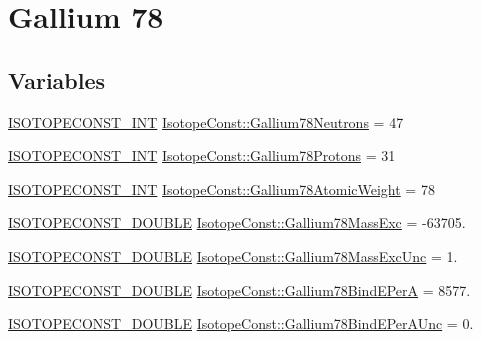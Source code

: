 \hypertarget{group___isotope_const-_gallium-_ga78}{}\section{Gallium 78}
\label{group___isotope_const-_gallium-_ga78}
\subsection*{Variables}
\begin{DoxyCompactItemize}
\item 
\mbox{\hyperlink{group___isotope_const-_macros_ga5f18360b3e99483a35c32d789e62621c}{I\+S\+O\+T\+O\+P\+E\+C\+O\+N\+S\+T\+\_\+\+I\+NT}} \mbox{\hyperlink{group___isotope_const-_gallium-_ga78_gadcd7eb5a26babdfa0c3ebdfb4a52911d}{Isotope\+Const\+::\+Gallium78\+Neutrons}} = 47
\item 
\mbox{\hyperlink{group___isotope_const-_macros_ga5f18360b3e99483a35c32d789e62621c}{I\+S\+O\+T\+O\+P\+E\+C\+O\+N\+S\+T\+\_\+\+I\+NT}} \mbox{\hyperlink{group___isotope_const-_gallium-_ga78_ga6361144357f601dcc11ebe86dadf613e}{Isotope\+Const\+::\+Gallium78\+Protons}} = 31
\item 
\mbox{\hyperlink{group___isotope_const-_macros_ga5f18360b3e99483a35c32d789e62621c}{I\+S\+O\+T\+O\+P\+E\+C\+O\+N\+S\+T\+\_\+\+I\+NT}} \mbox{\hyperlink{group___isotope_const-_gallium-_ga78_ga53f003a51b121d6910489fa93d6bca25}{Isotope\+Const\+::\+Gallium78\+Atomic\+Weight}} = 78
\item 
\mbox{\hyperlink{group___isotope_const-_macros_ga8f45a7272ce02c0b4c65c44636ed719a}{I\+S\+O\+T\+O\+P\+E\+C\+O\+N\+S\+T\+\_\+\+D\+O\+U\+B\+LE}} \mbox{\hyperlink{group___isotope_const-_gallium-_ga78_gae1d5533992513a2825c9c80b7a34bc55}{Isotope\+Const\+::\+Gallium78\+Mass\+Exc}} = -\/63705.
\item 
\mbox{\hyperlink{group___isotope_const-_macros_ga8f45a7272ce02c0b4c65c44636ed719a}{I\+S\+O\+T\+O\+P\+E\+C\+O\+N\+S\+T\+\_\+\+D\+O\+U\+B\+LE}} \mbox{\hyperlink{group___isotope_const-_gallium-_ga78_ga618fa5880c2568991bea8f2a16b03e21}{Isotope\+Const\+::\+Gallium78\+Mass\+Exc\+Unc}} = 1.
\item 
\mbox{\hyperlink{group___isotope_const-_macros_ga8f45a7272ce02c0b4c65c44636ed719a}{I\+S\+O\+T\+O\+P\+E\+C\+O\+N\+S\+T\+\_\+\+D\+O\+U\+B\+LE}} \mbox{\hyperlink{group___isotope_const-_gallium-_ga78_gac166141e3a296a6062a990ac153df67a}{Isotope\+Const\+::\+Gallium78\+Bind\+E\+PerA}} = 8577.
\item 
\mbox{\hyperlink{group___isotope_const-_macros_ga8f45a7272ce02c0b4c65c44636ed719a}{I\+S\+O\+T\+O\+P\+E\+C\+O\+N\+S\+T\+\_\+\+D\+O\+U\+B\+LE}} \mbox{\hyperlink{group___isotope_const-_gallium-_ga78_ga3f8e962634e2f1fd3d9e6adf6781a72a}{Isotope\+Const\+::\+Gallium78\+Bind\+E\+Per\+A\+Unc}} = 0.

\end{DoxyCompactItemize}
